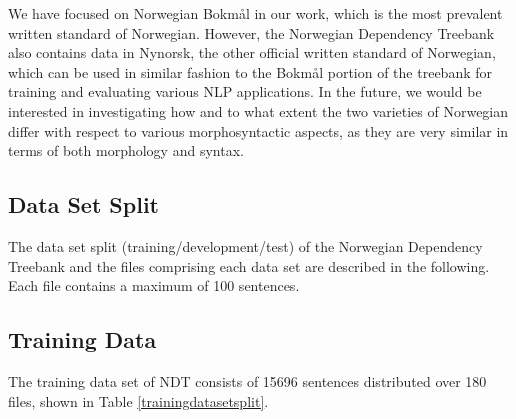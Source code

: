 \documentclass[a4paper,12pt,english]{book}
\begin{document}
We have focused on Norwegian Bokmål in our work, which is the most prevalent
written standard of Norwegian. However, the Norwegian Dependency Treebank also
contains data in Nynorsk, the other official written standard of Norwegian,
which can be used in similar fashion to the Bokmål portion of the treebank for
training and evaluating various NLP applications. In the future, we would be
interested in investigating how and to what extent the two varieties of
Norwegian differ with respect to various morphosyntactic aspects, as they are
very similar in terms of both morphology and syntax.

\begin{appendices}
    \chapter{Data Set Split}
    \label{chap:appsplit}
    The data set split (training/development/test) of the Norwegian Dependency
    Treebank and the files comprising each data set are described in the
    following. Each file contains a maximum of 100 sentences.

    \section{Training Data}
    The training data set of NDT consists of 15696 sentences distributed over
    180 files, shown in Table \ref{trainingdatasetsplit}.


\end{appendices}
\end{document}
